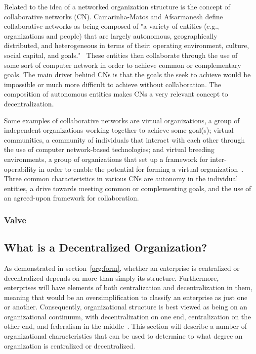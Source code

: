 Related to the idea of a networked organization structure is the concept of collaborative networks (CN). Camarinha-Matos and Afsarmanesh define collaborative networks as being composed of "a variety of entities (e.g., organizations and people) that are largely autonomous, geographically distributed, and heterogeneous in terms of their: operating environment, culture, social capital, and goals."~\cite{Camarinha-Matos2005} These entities then collaborate through the use of some sort of computer network in order to achieve common or complementary goals. The main driver behind CNs is that the goals the seek to achieve would be impossible or much more difficult to achieve without collaboration. The composition of autonomous entities makes CNs a very relevant concept to decentralization. 

Some examples of collaborative networks are virtual organizations, a group of independent organizations working together to achieve some goal(s); virtual communities, a community of individuals that interact with each other through the use of computer network-based technologies; and virtual breeding environments, a group of organizations that set up a framework for inter-operability in order to enable the potential for forming a virtual organization~\cite{Camarinha-Matos2005}. Three common characteristics in various CNs are autonomy in the individual entities, a drive towards meeting common or complementing goals, and the use of an agreed-upon framework for collaboration. 




\subsubsection{Valve}

\subsection{What is a Decentralized Organization?}

As demonstrated in section~\ref{org:form}, whether an enterprise is centralized or decentralized depends on more than simply its structure. Furthermore, enterprises will have elements of both centralization and decentralization in them, meaning that would be an oversimplification to classify an enterprise as just one or another. Consequently, organizational structure is best viewed as being on an organizational continuum, with decentralization on one end, centralization on the other end, and federalism in the middle~\cite{pearlson2009}. This section will describe a number of organizational characteristics that can be used to determine to what degree an organization is centralized or decentralized. 

